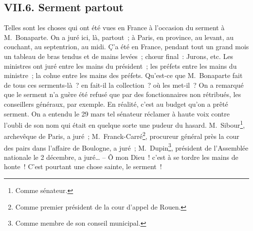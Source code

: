 \documentclass[french,twoside]{book} %
\begin{document}
\subsection[{VII.6. Serment partout}]{VII.6. Serment partout}
\noindent Telles sont les choses qui ont été vues en France à l’occasion du serment à M. Bonaparte. On a juré ici, là, partout ; à Paris, en province, au levant, au couchant, au septentrion, au midi. Ç’a été en France, pendant tout un grand mois un tableau de bras tendus et de mains levées ; chœur final : Jurons, etc. Les ministres ont juré entre les mains du président ; les préfets entre les mains du ministre ; la cohue entre les mains des préfets. Qu’est-ce que M. Bonaparte fait de tous ces serments-là ? en fait-il la collection ? où les met-il ? On a remarqué que le serment n’a guère été refusé que par des fonctionnaires non rétribués, les conseillers généraux, par exemple. En réalité, c’est au budget qu’on a prêté serment. On a entendu le 29 mars tel sénateur réclamer à haute voix contre l’oubli de son nom qui était en quelque sorte une pudeur du hasard. M. Sibour\footnote{Comme sénateur.}, archevêque de Paris, a juré ; M. Franck-Carré\footnote{Comme premier président de la cour d’appel de Rouen.}, procureur général près la cour des pairs dans l’affaire de Boulogne, a juré ; M. Dupin\footnote{Comme membre de son conseil municipal.}, président de l’Assemblée nationale le 2 décembre, a juré… – Ô mon Dieu ! c’est à se tordre les mains de honte ! C’est pourtant une chose sainte, le serment !\par
\end{document}

